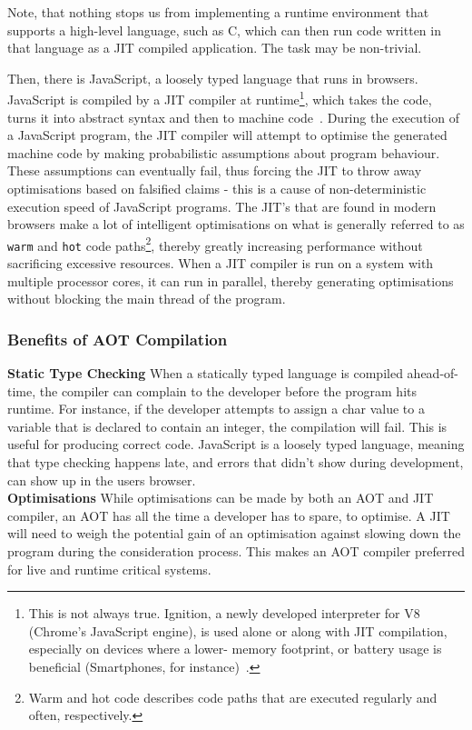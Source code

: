 \documentclass[a4paper]{article}
\begin{document}
Note, that nothing stops us from implementing a runtime environment that supports a high-level language, such as C, which can then run code written in that language as a JIT compiled application. The task may be non-trivial.

Then, there is JavaScript, a loosely typed language that runs in browsers. JavaScript is compiled by a JIT compiler at runtime\footnote{This is not always true. Ignition, a newly developed interpreter for V8 (Chrome's JavaScript engine), is used alone or along with JIT compilation, especially on devices where a lower- memory footprint, or battery usage is beneficial (Smartphones, for instance)~\cite{video:thompson-js-perf-v8-and-wasm}.}, which takes the code, turns it into abstract syntax and then to machine code~\cite[p.~13]{slides:lund-v8}. During the execution of a JavaScript program, the JIT compiler will attempt to optimise the generated machine code by making probabilistic assumptions about program behaviour. These assumptions can eventually fail, thus forcing the JIT to throw away optimisations based on falsified claims - this is a cause of non-deterministic execution speed of JavaScript programs. The JIT's that are found in modern browsers make a lot of intelligent optimisations on what is generally referred to as \texttt{warm} and \texttt{hot} code paths\footnote{Warm and hot code describes code paths that are executed regularly and often, respectively.}, thereby greatly increasing performance without sacrificing excessive resources. When a JIT compiler is run on a system with multiple processor cores, it can run in parallel, thereby generating optimisations without blocking the main thread of the program.

\subsubsection{Benefits of AOT Compilation}
\label{sec:problem-analysis:benefits-of-aot}
\textbf{Static Type Checking} When a statically typed language is compiled ahead-of-time, the compiler can complain to the developer before the program hits runtime. For instance, if the developer attempts to assign a char value to a variable that is declared to contain an integer, the compilation will fail. This is useful for producing correct code. JavaScript is a loosely typed language, meaning that type checking happens late, and errors that didn't show during development, can show up in the users browser.\\

\noindent \textbf{Optimisations} While optimisations can be made by both an AOT and JIT compiler, an AOT has all the time a developer has to spare, to optimise. A JIT will need to weigh the potential gain of an optimisation against slowing down the program during the consideration process. This makes an AOT compiler preferred for live and runtime critical systems.
\end{document}

